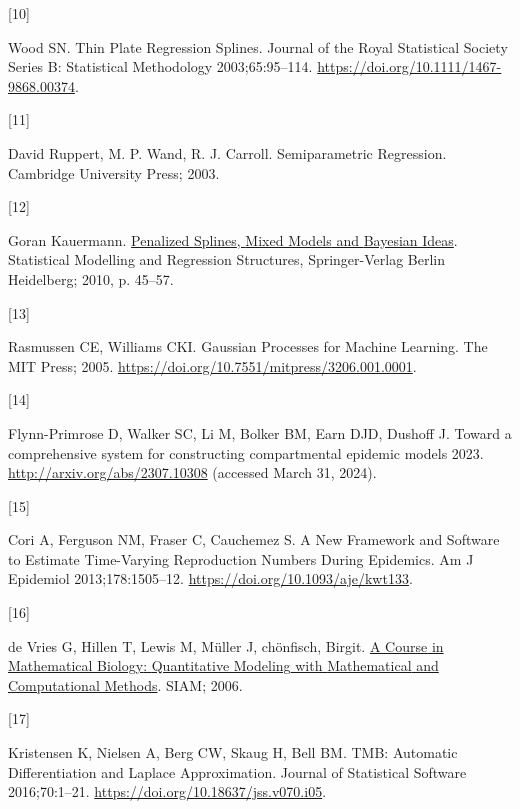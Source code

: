 \documentclass[
11pt, %
oneside, %
english, %
singlespacing, %
]{macthesis} %
\newlength{\cslhangindent}
\newlength{\csllabelwidth}
\newenvironment{CSLReferences}[2] %
{\begin{list}{}{%
	\setlength{\itemindent}{0pt}
	\setlength{\leftmargin}{0pt}
	\setlength{\parsep}{0pt}
	\ifodd #1
	\setlength{\leftmargin}{\cslhangindent}
	\setlength{\itemindent}{-1\cslhangindent}
	\fi
	\setlength{\itemsep}{#2\baselineskip}}}
{\end{list}}
\newcommand{\CSLLeftMargin}[1]{\parbox[t]{\csllabelwidth}{\strut#1\strut}}
\newcommand{\CSLRightInline}[1]{\parbox[t]{\linewidth - \csllabelwidth}{\strut#1\strut}}
\begin{document}
\begin{CSLReferences}{0}{0}
\CSLLeftMargin{{[}10{]} }%
\CSLRightInline{Wood SN. Thin {Plate Regression Splines}. Journal of the Royal Statistical Society Series B: Statistical Methodology 2003;65:95--114. \url{https://doi.org/10.1111/1467-9868.00374}.}

\CSLLeftMargin{{[}11{]} }%
\CSLRightInline{David Ruppert, M. P. Wand, R. J. Carroll. Semiparametric {Regression}. Cambridge University Press; 2003.}

\CSLLeftMargin{{[}12{]} }%
\CSLRightInline{Goran Kauermann. \href{https://link-springer-com.libaccess.lib.mcmaster.ca/book/10.1007/978-3-7908-2413-1}{Penalized {Splines}, {Mixed Models} and {Bayesian Ideas}}. Statistical {Modelling} and {Regression Structures}, Springer-Verlag Berlin Heidelberg; 2010, p. 45--57.}

\CSLLeftMargin{{[}13{]} }%
\CSLRightInline{Rasmussen CE, Williams CKI. Gaussian {Processes} for {Machine Learning}. The MIT Press; 2005. \url{https://doi.org/10.7551/mitpress/3206.001.0001}.}

\CSLLeftMargin{{[}14{]} }%
\CSLRightInline{Flynn-Primrose D, Walker SC, Li M, Bolker BM, Earn DJD, Dushoff J. Toward a comprehensive system for constructing compartmental epidemic models 2023. \url{http://arxiv.org/abs/2307.10308} (accessed March 31, 2024).}

\CSLLeftMargin{{[}15{]} }%
\CSLRightInline{Cori A, Ferguson NM, Fraser C, Cauchemez S. A {New Framework} and {Software} to {Estimate Time-Varying Reproduction Numbers During Epidemics}. Am J Epidemiol 2013;178:1505--12. \url{https://doi.org/10.1093/aje/kwt133}.}

\CSLLeftMargin{{[}16{]} }%
\CSLRightInline{de Vries G, Hillen T, Lewis M, Müller J, chönfisch, Birgit. \href{https://books.google.com?id=6bjaAQAAQBAJ}{A {Course} in {Mathematical Biology}: {Quantitative Modeling} with {Mathematical} and {Computational Methods}}. SIAM; 2006.}

\CSLLeftMargin{{[}17{]} }%
\CSLRightInline{Kristensen K, Nielsen A, Berg CW, Skaug H, Bell BM. {TMB}: {Automatic Differentiation} and {Laplace Approximation}. Journal of Statistical Software 2016;70:1--21. \url{https://doi.org/10.18637/jss.v070.i05}.}


\end{CSLReferences}
\end{document}
